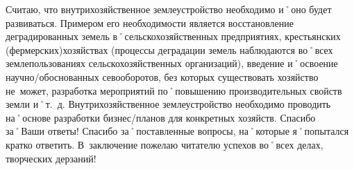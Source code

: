\begin{drama}
	\michaelspeaks Считаю, что внутрихозяйственное землеустройство необходимо и˚оно будет развиваться. Примером его необходимости является восстановление деградированных земель в˚сельскохозяйственных предприятиях, крестьянских (фермерских)хозяйствах (процессы деградации земель наблюдаются во˚всех землепользованиях сельскохозяйственных организаций), введение и˚освоение научно\-/обоснованных севооборотов, без которых существовать хозяйство не~может, разработка мероприятий по˚повышению производительных свойств земли и˚т.~д. Внутрихозяйственное землеустройство необходимо проводить на˚основе разработки бизнес\-/планов для конкретных хозяйств.
	\maxspeaks Спасибо за˚Ваши ответы!
	\michaelspeaks Спасибо за˚поставленные вопросы, на˚которые я˚попытался кратко ответить. В~заключение пожелаю читателю успехов во˚всех делах, творческих дерзаний!

\end{drama}